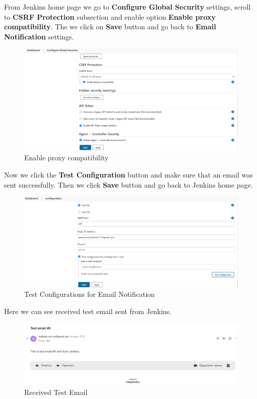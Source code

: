 \documentclass[12pt,a4paper,twoside]{article}
\begin{document}
From Jenkins home page we go to \textbf{Configure Global Security} settings, scroll to \textbf{CSRF Protection} subsection and enable option \textbf{Enable proxy compatibility}. The we click on \textbf{Save} button and go back to \textbf{Email Notification} settings.


\begin{figure}[H]
    \centering
        \includegraphics[width=15cm]{images-aws/52-enable-proxy-compatibility.png}
        \caption{Enable proxy compatibility}
\end{figure}


Now we click the \textbf{Test Configuration} button and make sure that an email was sent successfully. Then we click \textbf{Save} button and go back to Jenkins home page.


\begin{figure}[H]
    \centering
        \includegraphics[width=15cm]{images-aws/53-email-test-configuration.png}
        \caption{Test Configurations for Email Notification}
\end{figure}


Here we can see received test email sent from Jenkins.


\begin{figure}[H]
    \centering
        \includegraphics[width=15cm]{images-aws/54-email-test-confirmation.png}
        \caption{Received Test Email}
\end{figure}
\end{document}
